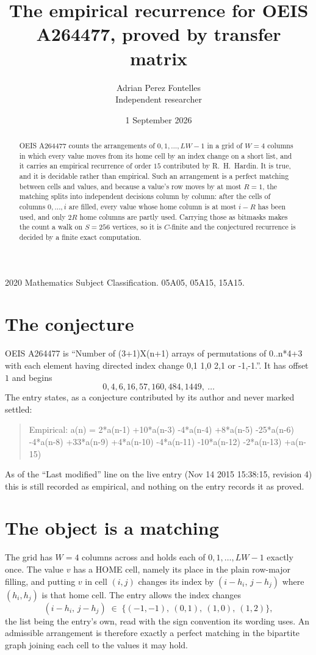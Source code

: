 \documentclass[11pt,a4paper]{article}
\title{The empirical recurrence for OEIS A264477, proved by transfer matrix}
\author{Adrian Perez Fontelles\\ \small Independent researcher}
\date{1 September 2026}
\theoremstyle{plain}
\theoremstyle{definition}
\begin{document}
\maketitle

\begin{abstract}
OEIS A264477 counts the arrangements of $0,1,\dots,LW-1$ in a grid of $W=4$ columns in which
every value moves from its home cell by an index change on a short list, and it carries an
empirical recurrence of order $15$ contributed by R.~H.~Hardin. It is true, and it is
decidable rather than empirical. Such an arrangement is a perfect matching between cells and
values, and because a value's row moves by at most $R=1$, the matching splits into
independent decisions column by column: after the cells of columns $0,\dots,i$ are filled,
every value whose home column is at most $i-R$ has been used, and only $2R$ home columns are
partly used. Carrying those as bitmasks makes the count a walk on $S=256$ vertices, so it is
$C$-finite and the conjectured recurrence is decided by a finite exact computation.
\end{abstract}

\noindent\small 2020 Mathematics Subject Classification. 05A05, 05A15, 15A15.\normalsize

\section{The conjecture}

OEIS A264477 is ``Number of (3+1)X(n+1) arrays of permutations of 0..n*4+3 with each element having directed index change 0,1 1,0 2,1 or -1,-1.''. It has offset $1$ and begins
\[
0, 4, 6, 16, 57, 160, 484, 1449,\ \dots
\]
The entry states, as a conjecture contributed by its author and never marked settled:
\begin{quote}
Empirical: a(n) = 2*a(n-1) +10*a(n-3) -4*a(n-4) +8*a(n-5) -25*a(n-6) -4*a(n-8) +33*a(n-9) +4*a(n-10) -4*a(n-11) -10*a(n-12) -2*a(n-13) +a(n-15)
\end{quote}
As of the ``Last modified'' line on the live entry (Nov 14 2015 15:38:15, revision 4) this is still
recorded as empirical, and nothing on the entry records it as proved.

\section{The object is a matching}

The grid has $W=4$ columns across and holds each of $0,1,\dots,LW-1$ exactly once. The value
$v$ has a HOME cell, namely its place in the plain row-major filling, and putting $v$ in cell
$(i,j)$ changes its index by $(i-h_i,\,j-h_j)$ where $(h_i,h_j)$ is that home cell. The entry
allows the index changes
\[
(i-h_i,\,j-h_j)\;\in\;\{(-1,-1),\ (0,1),\ (1,0),\ (1,2)\},
\]
the list being the entry's own, read with the sign convention its wording uses. An admissible
arrangement is therefore exactly a perfect matching in the bipartite graph joining each cell to
the values it may hold.
\end{document}
